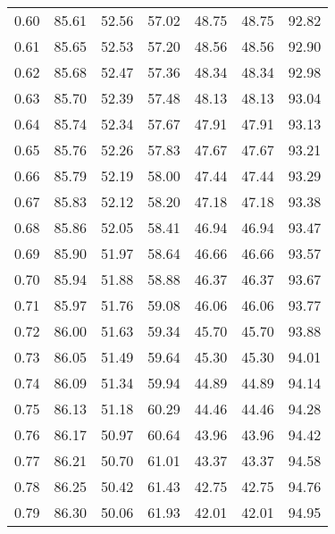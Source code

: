 \begin{tabular}{|c|c|c|c|c|c|c|}
      0.60 &     85.61 &     52.56 &      57.02 &   48.75 &      48.75 &         92.82 \\
      0.61 &     85.65 &     52.53 &      57.20 &   48.56 &      48.56 &         92.90 \\
      0.62 &     85.68 &     52.47 &      57.36 &   48.34 &      48.34 &         92.98 \\
      0.63 &     85.70 &     52.39 &      57.48 &   48.13 &      48.13 &         93.04 \\
      0.64 &     85.74 &     52.34 &      57.67 &   47.91 &      47.91 &         93.13 \\
      0.65 &     85.76 &     52.26 &      57.83 &   47.67 &      47.67 &         93.21 \\
      0.66 &     85.79 &     52.19 &      58.00 &   47.44 &      47.44 &         93.29 \\
      0.67 &     85.83 &     52.12 &      58.20 &   47.18 &      47.18 &         93.38 \\
      0.68 &     85.86 &     52.05 &      58.41 &   46.94 &      46.94 &         93.47 \\
      0.69 &     85.90 &     51.97 &      58.64 &   46.66 &      46.66 &         93.57 \\
      0.70 &     85.94 &     51.88 &      58.88 &   46.37 &      46.37 &         93.67 \\
      0.71 &     85.97 &     51.76 &      59.08 &   46.06 &      46.06 &         93.77 \\
      0.72 &     86.00 &     51.63 &      59.34 &   45.70 &      45.70 &         93.88 \\
      0.73 &     86.05 &     51.49 &      59.64 &   45.30 &      45.30 &         94.01 \\
      0.74 &     86.09 &     51.34 &      59.94 &   44.89 &      44.89 &         94.14 \\
      0.75 &     86.13 &     51.18 &      60.29 &   44.46 &      44.46 &         94.28 \\
      0.76 &     86.17 &     50.97 &      60.64 &   43.96 &      43.96 &         94.42 \\
      0.77 &     86.21 &     50.70 &      61.01 &   43.37 &      43.37 &         94.58 \\
      0.78 &     86.25 &     50.42 &      61.43 &   42.75 &      42.75 &         94.76 \\
      0.79 &     86.30 &     50.06 &      61.93 &   42.01 &      42.01 &         94.95 \\

\end{tabular}
